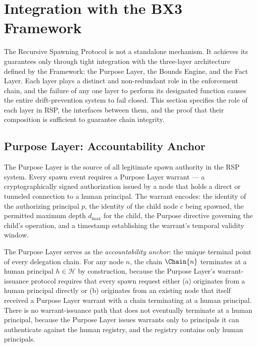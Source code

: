 \section{Integration with the BX3 Framework}
\label{sec:integration}

The Recursive Spawning Protocol is not a standalone mechanism. It achieves its guarantees only through tight integration with the three-layer architecture defined by the \bxthree{} Framework: the Purpose Layer, the Bounds Engine, and the Fact Layer. Each layer plays a distinct and non-redundant role in the enforcement chain, and the failure of any one layer to perform its designated function causes the entire drift-prevention system to fail closed. This section specifies the role of each layer in RSP, the interfaces between them, and the proof that their composition is sufficient to guarantee chain integrity.

\subsection{Purpose Layer: Accountability Anchor}
\label{sec:purpose-layer-accountability-anchor}

The Purpose Layer is the source of all legitimate spawn authority in the RSP system. Every spawn event requires a Purpose Layer warrant — a cryptographically signed authorization issued by a node that holds a direct or tunneled connection to a human principal. The warrant encodes: the identity of the authorizing principal $p$, the identity of the child node $c$ being spawned, the permitted maximum depth $d_{\max}$ for the child, the Purpose directive governing the child's operation, and a timestamp establishing the warrant's temporal validity window.

The Purpose Layer serves as the \textit{accountability anchor}: the unique terminal point of every delegation chain. For any node $n$, the chain $\Chain{n}$ terminates at a human principal $h \in \mathcal{H}$ by construction, because the Purpose Layer's warrant-issuance protocol requires that every spawn request either (a) originates from a human principal directly or (b) originates from an existing node that itself received a Purpose Layer warrant with a chain terminating at a human principal. There is no warrant-issuance path that does not eventually terminate at a human principal, because the Purpose Layer issues warrants only to principals it can authenticate against the human registry, and the registry contains only human principals.


